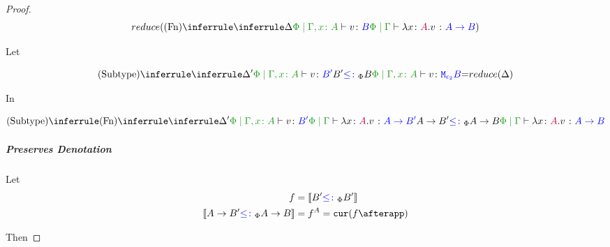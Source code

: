 \documentclass{report}
\begin{document}
\begin{framed}
\begin{proof}
                        \begin{equation}
                            \reduce(\ntreeruleI{\vfun}{
                                \treeruleI{\D}{\etyperelation{\P}{\gax}{v}{B}}
                            }{\gpetyperelation{\lam{x}{A}{v}}{\ab}})
                        \end{equation}
        
                        Let 
        
                        \begin{equation}
                            \ntreeruleII{\vsubtype}{
                                \treeruleI{\D'}{\etyperelation{\P}{\gax}{v}{B'}}
                                B' \subtypep B
                            }{
                                \etyperelation{\P}{\gax}{v}{\M{\e_2}{B}}
                            } = \reduce(\D)
                        \end{equation}
        
                        In
        
                        \begin{equation}
                            \ntreeruleII{\vsubtype}{
                                \ntreeruleI{\vfun}{
                                    \treeruleI{
                                        \D'
                                    }{
                                        \etyperelation{\P}{\gax}{v}{B'}
                                    }    
                                }{
                                    \gpetyperelation{\lam{x}{A}{v}}{\fntype{A}{B'}}
                                }
                                }{
                                \fntype{A}{B'}\subtypep\fntype{A}{B}
                            } {
                                \gpetyperelation{\lam{x}{A}{v}}{\fntype{A}{B}}
                            }
                        \end{equation}
        
                    \subparagraph{Preserves Denotation}
                        Let
                        \begin{align*}
                            f &= \deno{B'\subtypep B'} \\
                            \deno{\fntype{A}{B'}\subtypep\fntype{A}{B}} & = f^A = \cur{f\after \app}
                        \end{align*}
        
                        Then
        

\end{proof}
\end{framed}
\end{document}
